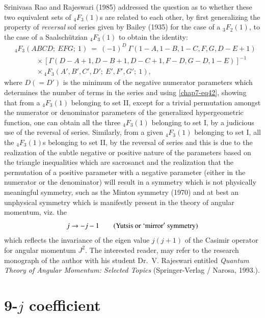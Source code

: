 Srinivasa Rao and Rajeswari (1985) addressed the question as to whether these two equivalent sets of $_4F_3(1)$s are related to each other, by first generalizing the property of \textit{reversal} sof series given by Bailey (1935) for the case of a $_3F_2(1)$, to the case of a Saalschützian $_4F_3(1)$ to obtain the identity:
\begin{equation}
\begin{split}
& {}_4F_3(ABCD;\ EFG;\ 1)\ =\ (-1)^D\ \Gamma(1-A,1-B,1-C,F,G,D-E+1)\\
& \qquad\quad\times [\Gamma(D-A+1, D-B+1, D-C+1, F-D, G-D, 1-E)]^{-1}\\
& \qquad\quad\times {}_4F_3(A',B',C',D';\ E',F',G';\ 1), \label{chap7-eq42}
\end{split}
\end{equation}
where $D(=D')$ is the minimum of the negative numerator parameters which determines the number of terms in the series and using \eqref{chap7-eq42}, showing that from a $_4F_3(1)$ belonging to set II, except for a trivial permutation amongst the numerator or denominator parameters of the generalized hypergeometric function, one can obtain all the three $_4F_3(1)$ belonging to set I, by a judicious use of the reversal of series. Similarly, from a given $_4F_3(1)$ belonging to set I, all the $_4F_3(1)$s belonging to set II, by the reversal of series and this is due to the realization of the subtle negative or positive nature of the parameters based on the triangle inequalities which are sacrosanct and the realization that the permutation of a positive parameter with a negative parameter (either in the numerator or the denominator) will result in a symmetry which is not physically meaningful symmetry, such as the Minton symmetry (1970) and at best an unphysical symmetry which is manifestly present in the theory of angular momentum, viz. the
\begin{equation} 
j\rightarrow -j-1 \qquad ({\rm Yutsis\ or\ `mirror'\ symmetry}) \label{chap7-eq43}
\end{equation}
which reflects the invariance of the eigen value $j(j+1)$ of the Casimir operator for angular momentum $J^2$. The interested reader, may refer to the research monograph of the author with his student Dr.\ V. Rajeswari entitled \textit{Quantum Theory of Angular Momentum: Selected Topics} (Springer-Verlag / Narosa, 1993.).

\section*{9-$j$ coefficient}

